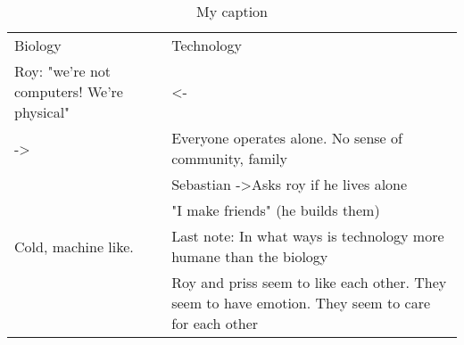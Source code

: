 \documentclass{article}
\begin{document}
\begin{table}[]
\centering
\caption{My caption}
\label{my-label}
\begin{tabular}{ll}
Biology                                    & Technology                                                                                         \\
Roy: "we're not computers! We're physical" & \textless-                                                                                         \\
-\textgreater                              & Everyone operates alone. No sense of community, family                                             \\
                                           & Sebastian -\textgreater Asks roy if he lives alone                                                 \\
                                           & "I make friends" (he builds them)                                                                  \\
Cold, machine like.                        & Last note: In what ways is technology more humane than the biology                                 \\
                                           & Roy and priss seem to like each other. They seem to have emotion. They seem to care for each other
\end{tabular}
\end{table}
\end{document}
